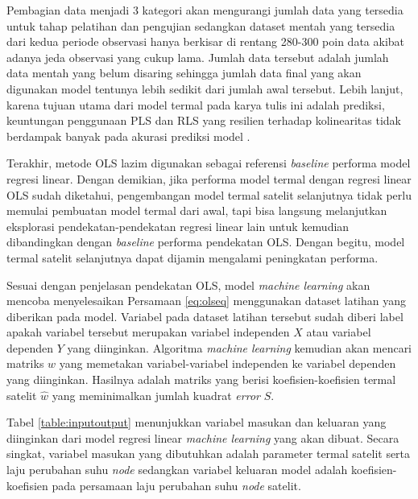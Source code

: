 Pembagian data menjadi 3 kategori akan mengurangi jumlah data yang tersedia
untuk tahap pelatihan dan pengujian sedangkan dataset mentah yang tersedia dari
kedua periode observasi hanya berkisar di rentang 280-300 poin data akibat
adanya jeda observasi yang cukup lama. Jumlah data tersebut adalah jumlah data
mentah yang belum disaring sehingga jumlah data final yang akan digunakan model
tentunya lebih sedikit dari jumlah awal tersebut. Lebih lanjut, karena tujuan utama
dari model termal pada karya tulis ini adalah prediksi, keuntungan penggunaan
PLS dan RLS yang resilien terhadap kolinearitas tidak berdampak banyak pada
akurasi prediksi model \cite{lieberman2014}\cite{mundfrom2018}.

Terakhir, metode OLS lazim digunakan sebagai referensi \textit{baseline}
performa model regresi linear. Dengan demikian, jika performa model termal
dengan regresi linear OLS sudah diketahui, pengembangan model termal satelit
selanjutnya tidak perlu memulai pembuatan model termal dari awal, tapi bisa
langsung melanjutkan eksplorasi pendekatan-pendekatan regresi linear lain untuk
kemudian dibandingkan dengan \textit{baseline} performa pendekatan OLS. Dengan
begitu, model termal satelit selanjutnya dapat dijamin mengalami peningkatan
performa.

Sesuai dengan penjelasan pendekatan OLS, model \textit{machine learning} akan
mencoba menyelesaikan Persamaan \ref{eq:olseq} menggunakan dataset latihan yang
diberikan pada model. Variabel pada dataset latihan tersebut sudah diberi label
apakah variabel tersebut merupakan variabel independen $X$ atau variabel
dependen $Y$ yang diinginkan. Algoritma \textit{machine learning} kemudian akan
mencari matriks $w$ yang memetakan variabel-variabel independen ke variabel
dependen yang diinginkan. Hasilnya adalah matriks yang berisi
koefisien-koefisien termal satelit $\hat{w}$ yang meminimalkan jumlah kuadrat
\textit{error} $S$.

Tabel \ref{table:inputoutput} menunjukkan variabel masukan dan keluaran yang
diinginkan dari model regresi linear \textit{machine learning} yang akan dibuat. Secara
singkat, variabel masukan yang dibutuhkan adalah parameter termal satelit serta
laju perubahan suhu \textit{node} sedangkan variabel keluaran model adalah
koefisien-koefisien pada persamaan laju perubahan suhu \textit{node} satelit.


